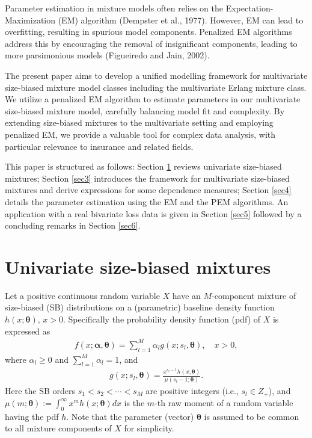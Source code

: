 \documentclass[11pt]{article}
\def\a{\alpha} \def\b{\beta}
\def\beq{\begin{eqnarray}} \def\eeq{\end{eqnarray}}
\begin{document}
Parameter estimation in mixture models often relies on the Expectation-Maximization (EM) algorithm (Dempster et al., 1977\nocite{dempster1977maximum}). However, EM can lead to overfitting, resulting in spurious model components. Penalized EM algorithms address this by encouraging the removal of insignificant components, leading to more parsimonious models (Figueiredo and Jain, 2002\nocite{Figueiredo}). 

The present paper aims to develop a unified modelling framework for multivariate size-biased mixture model classes including the multivariate Erlang mixture class. We utilize a penalized EM algorithm to estimate parameters in our multivariate size-biased mixture model, carefully balancing model fit and complexity. By extending size-biased mixtures to the multivariate setting and employing penalized EM, we provide a valuable tool for complex data analysis, with particular relevance to insurance and related fields. 

This paper is structured as follows: Section \ref{sec2} reviews univariate size-biased mixtures; Section \ref{sec3} introduces the framework for multivariate size-biased mixtures and derive expressions for some  dependence measures; Section \ref{sec4} details the parameter estimation using the EM  and the PEM algorithms. An application with a real bivariate loss data is given in Section \ref{sec5} followed by a concluding remarks in Section \ref{sec6}.


\section{Univariate size-biased mixtures}\label{sec2}
Let a positive continuous random variable $X$ have an $M$-component mixture of size-biased (SB) distributions on a (parametric) baseline density function $h(x; \bm{\theta}),\, x >0$. Specifically the probability density function (pdf) of $X$ is expressed as   
\beq\label{pdf_marginal}
f(x; \bm{\a}, \bm{\theta}) = \sum_{l = 1}^{M} \a_{l} g(x;s_l, \bm{\theta}),\quad x >0,
\eeq
where $\a_{l} \ge 0$ and $\sum_{l = 1}^{M} \a_{l} = 1$, and
\beq\label{sb_den}
g(x;s_l, \bm{\theta}) = \frac{x^{s_l -1} h(x; \bm{\theta})}{\mu(s_l -1; \bm{\theta})}.
\eeq
Here the SB orders $s_1 < s_2 < \cdots < s_{M}$ are positive integers (i.e., $s_l \in Z_+$), and $\mu(m; \bm{\theta}) := \int_0^{\infty} x^m h(x;\bm{\theta}) dx$ is the $m$-th raw moment of a random variable having the pdf $h$. Note that the parameter (vector) $\bm{\theta}$ is assumed to be common to all mixture components of $X$ for simplicity. 
\end{document}
